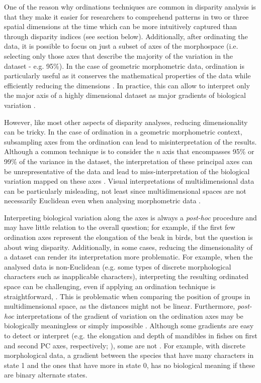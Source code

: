 \documentclass[12pt,letterpaper]{article}
\begin{document}
One of the reason why ordinations techniques are common in disparity analysis is that they make it easier for researchers to comprehend patterns in two or three spatial dimensions at the time which can be more intuitively captured than through disparity indices (see section below). %
Additionally, after ordinating the data, it is possible to focus on just a subset of axes of the morphospace (i.e. selecting only those axes that describe the majority of the variation in the dataset - e.g. 95\%).
In the case of geometric morphometric data, ordination is particularly useful as it conserves the mathematical properties of the data while efficiently reducing the dimensions \citep{Legendre2012-va,dryden2016statistical}.
In practice, this can allow to interpret only the major axis of a highly dimensional dataset as major gradients of biological variation \citep[e.g. the elongation and flattening of birds beaks;][]{Cooney2017-ly}.

However, like most other aspects of disparity analyses, reducing dimensionality can be tricky.
In the case of ordination in a geometric morphometric context, subsampling axes from the ordination can lead to misinterpretation of the results. 
Although a common technique is to consider the \textit{n} axis that encompasses 95\% or 99\% of the variance in the dataset, the interpretation of these principal axes can be unrepresentative of the data and lead to miss-interpretation of the biological variation mapped on these axes \citep{Bookstein2015-yy, Bookstein2017-qk, Bookstein2017-gu,Weisbecker2019-kp}.
Visual interpretations of multidimensional data can be particularly misleading, not least since multidimensional spaces are not necessarily Euclidean even when analysing morphometric data \citep{Deline2018-le, Gerber2017-xi}.

Interpreting biological variation along the axes is always a \textit{post-hoc} procedure and may have little relation to the overall question; for example, if the first few ordination axes represent the elongation of the beak in birds, but the question is about wing disparity.
Additionally, in some cases, reducing the dimensionality of a dataset can render its interpretation more problematic.
For example, when the analysed data is non-Euclidean (e.g. some types of discrete morphological characters such as inapplicable characters), interpreting the resulting ordinated space can be challenging, even if applying an ordination technique is straightforward, \citep{Gerber2019}.
This is problematic when comparing the position of groups in multidimensional space, as the distances might not be linear.
Furthermore, \textit{post-hoc} interpretations of the gradient of variation on the ordination axes may be biologically meaningless or simply impossible \citep{Gerber2019}.
Although some gradients are easy to detect or interpret (e.g. the elongation and depth of mandibles in fishes on first and second PC axes, respectively; \citealt{Hill2018-ye}), some are not \citep[e.g.][]{Weisbecker2019-kp}.
For example, with discrete morphological data, a gradient between the species that have many characters in state 1 and the ones that have more in state 0, has no biological meaning if these are binary alternate states.
\end{document}
